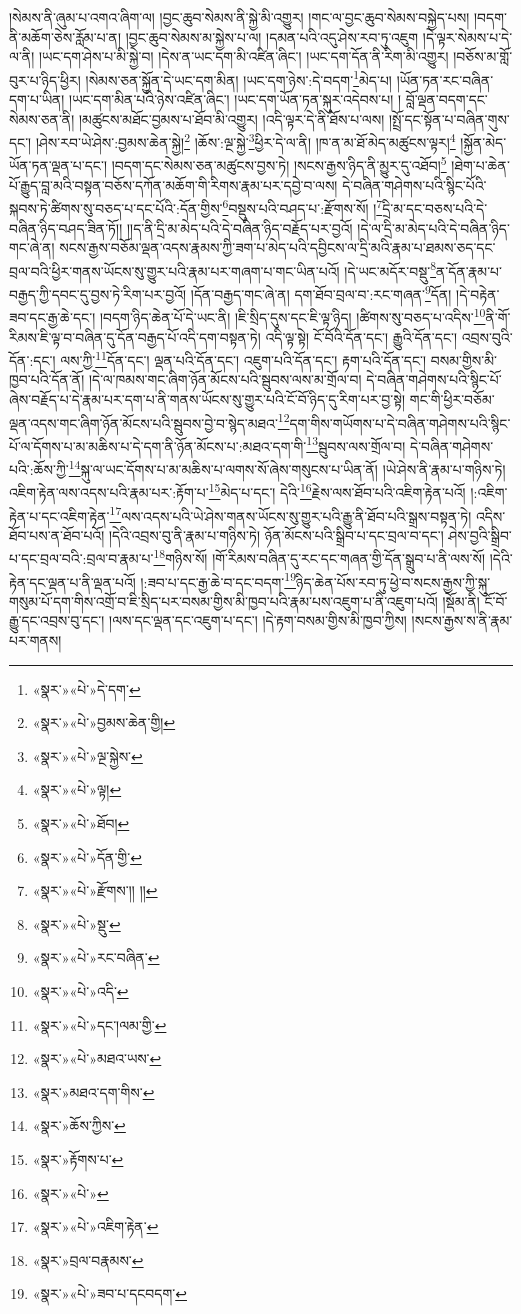 །སེམས་ནི་ཞུམ་པ་འགའ་ཞིག་ལ། །བྱང་ཆུབ་སེམས་ནི་སྐྱེ་མི་འགྱུར། །གང་ལ་བྱང་ཆུབ་སེམས་བསྐྱེད་པས། །བདག་ནི་མཆོག་ཅེས་རློམ་པ་ན། །བྱང་ཆུབ་སེམས་མ་སྐྱེས་པ་ལ། །དམན་པའི་འདུ་ཤེས་རབ་ཏུ་འཇུག །དེ་ལྟར་སེམས་པ་དེ་ལ་ནི། །ཡང་དག་ཤེས་པ་མི་སྐྱེ་བ། །དེས་ན་ཡང་དག་མི་འཛིན་ཞིང་། །ཡང་དག་དོན་ནི་རིག་མི་འགྱུར། །བཅོས་མ་གློ་བུར་པ་ཉིད་ཕྱིར། །སེམས་ཅན་སྐྱོན་དེ་ཡང་དག་མིན། །ཡང་དག་ཉེས་:དེ་བདག་\footnote{«སྣར་»«པེ་»དེ་དག་}མེད་པ། །ཡོན་ཏན་རང་བཞིན་དག་པ་ཡིན། །ཡང་དག་མིན་པའི་ཉེས་འཛིན་ཞིང་། །ཡང་དག་ཡོན་ཏན་སྐུར་འདེབས་པ། །
བློ་ལྡན་བདག་དང་སེམས་ཅན་ནི། །མཚུངས་མཐོང་བྱམས་པ་ཐོབ་མི་འགྱུར། །འདི་ལྟར་དེ་ནི་ཐོས་པ་ལས། །སྤྲོ་དང་སྟོན་པ་བཞིན་གུས་དང་། །ཤེས་རབ་ཡེ་ཤེས་:བྱམས་ཆེན་སྐྱེ།\footnote{«སྣར་»«པེ་»བྱམས་ཆེན་གྱི།} །ཆོས་:ལྔ་སྐྱེ་\footnote{«སྣར་»«པེ་»ལྔ་སྐྱེས་}ཕྱིར་དེ་ལ་ནི། །ཁ་ན་མ་ཐོ་མེད་མཚུངས་ལྟར།\footnote{«སྣར་»«པེ་»ལྟ།} །སྐྱོན་མེད་ཡོན་ཏན་ལྡན་པ་དང་། །བདག་དང་སེམས་ཅན་མཚུངས་བྱས་ཏེ། །སངས་རྒྱས་ཉིད་ནི་མྱུར་དུ་འཐོབ།\footnote{«སྣར་»«པེ་»ཐོབ།} །ཐེག་པ་ཆེན་པོ་རྒྱུད་བླ་མའི་བསྟན་བཅོས་དཀོན་མཆོག་གི་རིགས་རྣམ་པར་དབྱེ་བ་ལས། དེ་བཞིན་གཤེགས་པའི་སྙིང་པོའི་སྐབས་ཏེ་ཚིགས་སུ་བཅད་པ་དང་པོའི་:དོན་གྱིས་\footnote{«སྣར་»«པེ་»དོན་གྱི་}བསྡུས་པའི་བཤད་པ་:རྫོགས་སོ། །\footnote{«སྣར་»«པེ་»རྫོགས་།། །།}དྲི་མ་དང་བཅས་པའི་དེ་བཞིན་ཉིད་བཤད་ཟིན་ཏོ།། །།ད་ནི་དྲི་མ་མེད་པའི་དེ་བཞིན་ཉིད་བརྗོད་པར་བྱའོ། །དེ་ལ་དྲི་མ་མེད་པའི་དེ་བཞིན་ཉིད་གང་ཞེ་ན། སངས་རྒྱས་བཅོམ་ལྡན་འདས་རྣམས་ཀྱི་ཟག་པ་མེད་པའི་དབྱིངས་ལ་དྲི་མའི་རྣམ་པ་ཐམས་ཅད་དང་བྲལ་བའི་ཕྱིར་གནས་ཡོངས་སུ་གྱུར་པའི་རྣམ་པར་གཞག་པ་གང་ཡིན་པའོ། །དེ་ཡང་མདོར་བསྡུ་\footnote{«སྣར་»«པེ་»སྡུ་}ན་དོན་རྣམ་པ་བརྒྱད་ཀྱི་དབང་དུ་བྱས་ཏེ་རིག་པར་བྱའོ། །དོན་བརྒྱད་གང་ཞེ་ན། དག་ཐོབ་བྲལ་བ་:རང་གཞན་\footnote{«སྣར་»«པེ་»རང་བཞིན་}དོན། །དེ་བརྟེན་ཟབ་དང་རྒྱ་ཆེ་དང་། །བདག་ཉིད་ཆེན་པོ་དེ་ཡང་ནི། །ཇི་སྲིད་དུས་དང་ཇི་ལྟ་ཉིད། །ཚིགས་སུ་བཅད་པ་འདིས་\footnote{«སྣར་»«པེ་»འདི་}ནི་གོ་རིམས་ཇི་ལྟ་བ་བཞིན་དུ་དོན་བརྒྱད་པོ་འདི་དག་བསྟན་ཏེ། འདི་ལྟ་སྟེ། ངོ་བོའི་དོན་དང་། རྒྱུའི་དོན་དང་། འབྲས་བུའི་དོན་:དང་། ལས་ཀྱི་\footnote{«སྣར་»«པེ་»དང་།ལམ་གྱི་}དོན་དང་། ལྡན་པའི་དོན་དང་། འཇུག་པའི་དོན་དང་། རྟག་པའི་དོན་དང་། བསམ་གྱིས་མི་ཁྱབ་པའི་དོན་ནོ། །དེ་ལ་ཁམས་གང་ཞིག་ཉོན་མོངས་པའི་སྦུབས་ལས་མ་གྲོལ་བ། དེ་བཞིན་གཤེགས་པའི་སྙིང་པོ་ཞེས་བརྗོད་པ་དེ་རྣམ་པར་དག་པ་ནི་གནས་ཡོངས་སུ་གྱུར་པའི་ངོ་བོ་ཉིད་དུ་རིག་པར་བྱ་སྟེ། གང་གི་ཕྱིར་བཅོམ་ལྡན་འདས་གང་ཞིག་ཉོན་མོངས་པའི་སྦུབས་བྱེ་བ་སྙེད་མཐའ་\footnote{«སྣར་»«པེ་»མཐའ་ཡས་}དག་གིས་གཡོགས་པ་དེ་བཞིན་གཤེགས་པའི་སྙིང་པོ་ལ་དོགས་པ་མ་མཆིས་པ་དེ་དག་ནི་ཉོན་མོངས་པ་:མཐའ་དག་གི་\footnote{«སྣར་»མཐའ་དག་གིས་}སྦུབས་ལས་གྲོལ་བ། དེ་བཞིན་གཤེགས་པའི་:ཆོས་ཀྱི་\footnote{«སྣར་»ཆོས་ཀྱིས་}སྐུ་ལ་ཡང་དོགས་པ་མ་མཆིས་པ་ལགས་སོ་ཞེས་གསུངས་པ་ཡིན་ནོ། །ཡེ་ཤེས་ནི་རྣམ་པ་གཉིས་ཏེ། འཇིག་རྟེན་ལས་འདས་པའི་རྣམ་པར་:རྟོག་པ་\footnote{«སྣར་»རྟོགས་པ་}མེད་པ་དང་། དེའི་\footnote{«སྣར་»«པེ་»}རྗེས་ལས་ཐོབ་པའི་འཇིག་རྟེན་པའོ། །:འཇིག་རྟེན་པ་དང་འཇིག་རྟེན་\footnote{«སྣར་»«པེ་»འཇིག་རྟེན་}ལས་འདས་པའི་ཡེ་ཤེས་གནས་ཡོངས་སུ་གྱུར་པའི་རྒྱུ་ནི་ཐོབ་པའི་སྒྲས་བསྟན་ཏེ། འདིས་ཐོབ་པས་ན་ཐོབ་པའོ། །དེའི་འབྲས་བུ་ནི་རྣམ་པ་གཉིས་ཏེ། ཉོན་མོངས་པའི་སྒྲིབ་པ་དང་བྲལ་བ་དང་། ཤེས་བྱའི་སྒྲིབ་པ་དང་བྲལ་བའི་:བྲལ་བ་རྣམ་པ་\footnote{«སྣར་»བྲལ་བརྣམས་}གཉིས་སོ། །གོ་རིམས་བཞིན་དུ་རང་དང་གཞན་གྱི་དོན་སྒྲུབ་པ་ནི་ལས་སོ། །དེའི་རྟེན་དང་ལྡན་པ་ནི་ལྡན་པའོ། །:ཟབ་པ་དང་རྒྱ་ཆེ་བ་དང་བདག་\footnote{«སྣར་»«པེ་»ཟབ་པ་དངབདག་}ཉིད་ཆེན་པོས་རབ་ཏུ་ཕྱེ་བ་སངས་རྒྱས་ཀྱི་སྐུ་གསུམ་པོ་དག་གིས་འགྲོ་བ་ཇི་སྲིད་པར་བསམ་གྱིས་མི་ཁྱབ་པའི་རྣམ་པས་འཇུག་པ་ནི་འཇུག་པའོ། །སྡོམ་ནི། ངོ་བོ་རྒྱུ་དང་འབྲས་བུ་དང་། །ལས་དང་ལྡན་དང་འཇུག་པ་དང་། །དེ་རྟག་བསམ་གྱིས་མི་ཁྱབ་ཀྱིས། །སངས་རྒྱས་ས་ནི་རྣམ་པར་གནས། 